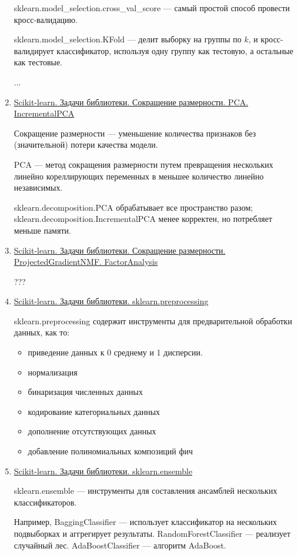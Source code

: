 \documentclass{proc}
\begin{document}
\begin{enumerate}
		sklearn.model\_selection.cross\_val\_score --- самый простой способ провести кросс-валидацию.
		
		sklearn.model\_selection.KFold --- делит выборку на группы по $k$, и кросс-валидирует классификатор, используя одну группу как тестовую, а остальные как тестовые.
		
		...
		
		\item \uline{Scikit-learn. Задачи библиотеки. Сокращение размерности. PCA. IncrementalPCA}
		
		Сокращение размерности --- уменьшение количества признаков без (значительной) потери качества модели.
		
		PCA --- метод сокращения размерности путем превращения нескольких линейно кореллирующих переменных в меньшее количество линейно независимых. 
		
		sklearn.decomposition.PCA обрабатывает все пространство разом; sklearn.decomposition.IncrementalPCA менее корректен, но потребляет меньше памяти.
		
		\item \uline{Scikit-learn. Задачи библиотеки. Сокращение размерности. ProjectedGradientNMF. FactorAnalysis}
		
		???
		
		\item \uline{Scikit-learn. Задачи библиотеки. sklearn.preprocessing}
		
		sklearn.preprocessing содержит инструменты для предварительной обработки данных, как то:
		
		\begin{itemize}
			\item приведение данных к 0 среднему и 1 дисперсии.
			\item нормализация
			\item бинаризация численных данных
			\item кодирование категориальных данных
			\item дополнение отсутствующих данных
			\item добавление полиномиальных композиций фич
		\end{itemize}
	
	
		\item \uline{Scikit-learn. Задачи библиотеки. sklearn.ensemble}
		
		sklearn.ensemble --- инструменты для составления ансамблей нескольких классификаторов.
		
		Например, BaggingClassifier --- использует классификатор на нескольких подвыборках и аггрегирует результаты. RandomForestClassifier --- реализует случайный лес. AdaBoostClassifier --- алгоритм AdaBoost.
		
	\end{enumerate}
\end{document}
